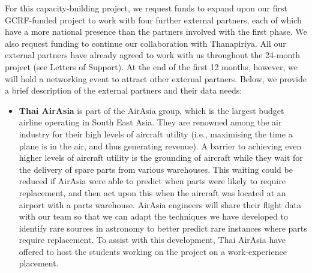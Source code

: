 \documentclass[11pt]{article}
\begin{document}
  For this capacity-building project, we request funds to expand upon our first GCRF-funded project to work with four further external partners, each of which have a more national presence than the partners involved with the first phase. We also request funding to continue our collaboration with Thanapiriya. All our external partners have already agreed to work with us throughout the 24-month project (see Letters of Support). At the end of the first 12 months, however, we will hold a networking event to attract other external partners. Below, we provide a brief description of the external partners and their data needs:
  
  \begin{itemize}
  \item {\bf Thai AirAsia} is part of the AirAsia group, which is the largest budget airline operating in South East Asia. They are renowned among the air industry for their high levels of aircraft utility (i.e., maximising the time a plane is in the air, and thus generating revenue). A barrier to achieving even higher levels of aircraft utility is the grounding of aircraft while they wait for the delivery of spare parts from various warehouses. This waiting could be reduced if AirAsia were able to predict when parts were likely to require replacement, and then act upon this when the aircraft was located at an airport with a parts warehouse. AirAsia engineers will share their flight data with our team so that we can adapt the techniques we have developed to identify rare sources in astronomy to better predict rare instances where parts require replacement. To assist with this development, Thai AirAsia have offered to host the students working on the project on a work-experience placement.

\end{itemize}
\end{document}
